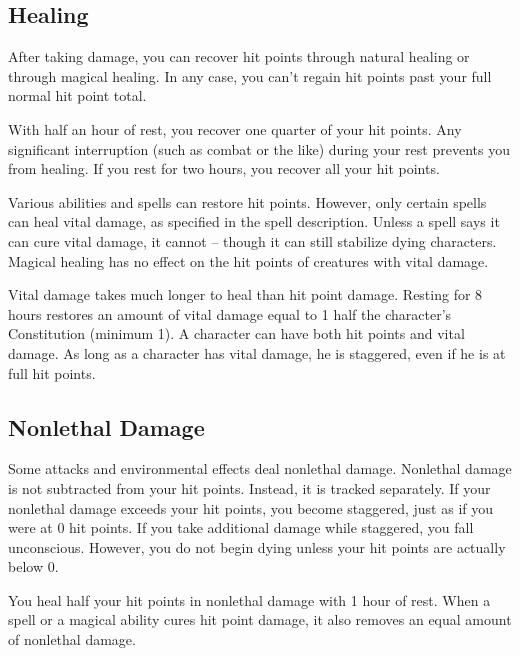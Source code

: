     \subsection{Healing}
        After taking damage, you can recover hit points through natural healing or through magical healing.
        In any case, you can't regain hit points past your full normal hit point total.

         With half an hour of rest, you recover one quarter of your hit points.
        Any significant interruption (such as combat or the like) during your rest prevents you from healing.
        If you rest for two hours, you recover all your hit points.

         Various abilities and spells can restore hit points.
        However, only certain spells can heal vital damage, as specified in the spell description.
        Unless a spell says it can cure vital damage, it cannot -- though it can still stabilize dying characters.
        Magical healing has no effect on the hit points of creatures with vital damage.

         Vital damage takes much longer to heal than hit point damage.
        Resting for 8 hours restores an amount of vital damage equal to 1 \add half the character's Constitution (minimum 1).
        A character can have both hit points and vital damage.
        As long as a character has vital damage, he is staggered, even if he is at full hit points.

    \subsection{Nonlethal Damage}\label{Nonlethal Damage}
        Some attacks and environmental effects deal nonlethal damage.
        Nonlethal damage is not subtracted from your hit points.
        Instead, it is tracked separately.
        If your nonlethal damage exceeds your hit points, you become staggered, just as if you were at 0 hit points.
        If you take additional damage while staggered, you fall unconscious.
        However, you do not begin dying unless your hit points are actually below 0.

        You heal half your hit points in nonlethal damage with 1 hour of rest.
        When a spell or a magical ability cures hit point damage, it also removes an equal amount of nonlethal damage.

